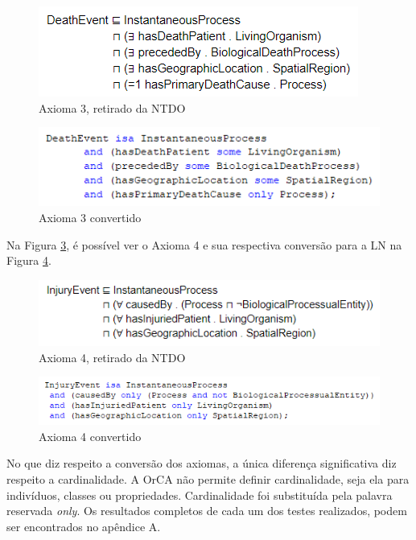 \documentclass{bcc}
\begin{document}
\begin{figure}[H]
\centering
\includegraphics[width=.6\textwidth]{Figuras/axioma3.png}
\caption{Axioma 3, retirado da NTDO} 
\label{fig:axioma3}
\end{figure}

\begin{figure}[H]
\centering
\includegraphics[width=.8\textwidth]{Figuras/axioma3_ln.png}
\caption{Axioma 3 convertido} 
\label{fig:axioma3_ln}
\end{figure}

Na Figura \ref{fig:axioma4}, é possível ver o Axioma 4 e sua respectiva conversão para a LN na Figura \ref{fig:axioma4_ln}.

\begin{figure}[H]
\centering
\includegraphics[width=.8\textwidth]{Figuras/axioma4.png}
\caption{Axioma 4, retirado da NTDO} 
\label{fig:axioma4}
\end{figure}

\begin{figure}[H]
\centering
\includegraphics[width=.9\textwidth]{Figuras/axioma4_ln.png}
\caption{Axioma 4 convertido} 
\label{fig:axioma4_ln}
\end{figure}

No que diz respeito a conversão dos axiomas, a única diferença significativa diz respeito a cardinalidade. A OrCA não permite definir cardinalidade, seja ela para indivíduos, classes ou propriedades. Cardinalidade foi substituída pela palavra reservada \textit{only}.
Os resultados completos de cada um dos testes realizados, podem ser encontrados no apêndice A.
\end{document}

